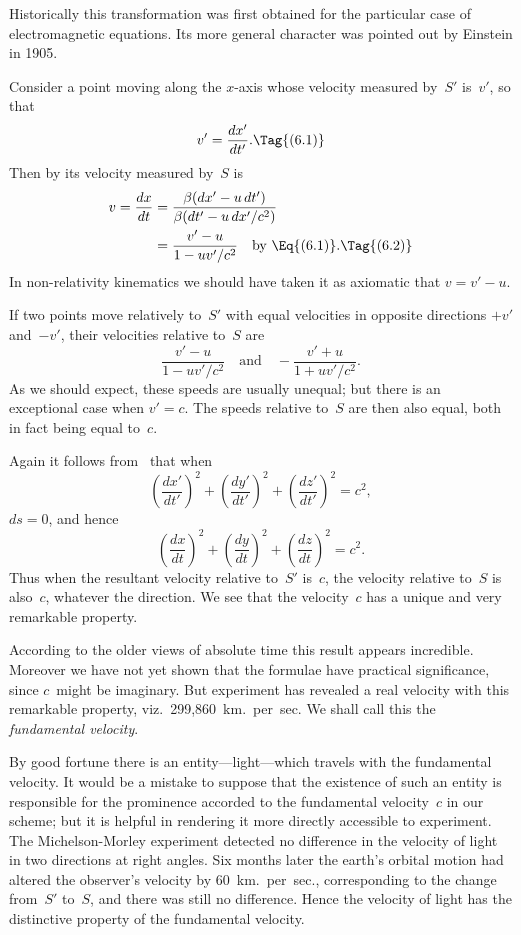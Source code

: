 \documentclass[12pt]{book}
\begin{document}
Historically this transformation was first obtained for the particular case
of electromagnetic equations. Its more general character was pointed out by
Einstein in 1905.

%

Consider a point moving along the $x$-axis whose velocity measured by~$S'$
is~$v'$, so that
\[
v' = \frac{dx'}{dt'}.
\Tag{(6.1)}
\]
Then by  its velocity measured by~$S$ is
\begin{align*}
  v = \frac{dx}{dt}
  &= \frac{\beta(dx' - u\, dt')}{\beta(dt' - u\, dx'/c^2)} \\
  &= \frac{v' - u}{1 - u v'/c^2}\quad\text{by \Eq{(6.1)}.}
  \Tag{(6.2)}
\end{align*}
In non\hyp{}relativity kinematics we should have taken it as axiomatic that
$v = v' - u$.

If two points move relatively to~$S'$ with equal velocities in opposite
directions $+v'$ and~$-v'$, their velocities relative to~$S$ are
\[
\frac{v' - u}{1 - u v'/c^2}\quad\text{and}\quad
-\frac{v' + u}{1 + u v'/c^2}.
\]
As we should expect, these speeds are usually unequal; but there is an exceptional
case when $v' = c$. The speeds relative to~$S$ are then also equal, both
in fact being equal to~$c$.

Again it follows from~ that when
\[
\left(\frac{dx'}{dt'}\right)^{2} + \left(\frac{dy'}{dt'}\right)^{2} + \left(\frac{dz'}{dt'}\right)^{2} = c^2,
\]
$ds = 0$, and hence
\[
\left(\frac{dx}{dt}\right)^{2} + \left(\frac{dy}{dt}\right)^{2} + \left(\frac{dz}{dt}\right)^{2} = c^2.
\]
Thus when the resultant velocity relative to~$S'$ is~$c$, the velocity relative to~$S$
is also~$c$, whatever the direction. We see that the velocity~$c$ has a unique
and very remarkable property.

According to the older views of absolute time this result appears incredible.
Moreover we have not yet shown that the formulae have practical significance,
since $c$~might be imaginary. But experiment has revealed a real velocity
with this remarkable property, viz.\ 299,860~km.\ per~sec. We shall call this
the \emph{fundamental velocity}.
%
%

By good fortune there is an entity---light---which travels with the fundamental
%
velocity. It would be a mistake to suppose that the existence of such
an entity is responsible for the prominence accorded to the fundamental velocity~$c$
in our scheme; but it is helpful in rendering it more directly accessible to
experiment. The Michelson\hyp{}Morley experiment detected no difference in the
%
velocity of light in two directions at right angles. Six months later the earth's
%
orbital motion had altered the observer's velocity by 60~km.\ per~sec., corresponding
to the change from~$S'$ to~$S$, and there was still no difference. Hence
the velocity of light has the distinctive property of the fundamental velocity.
\end{document}
